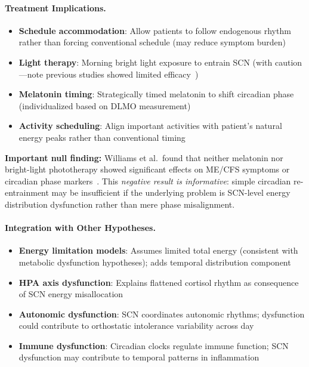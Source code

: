 \begin{hypothesis}
\paragraph{Treatment Implications.}
\begin{itemize}
  \item \textbf{Schedule accommodation}: Allow patients to follow endogenous rhythm rather than forcing conventional schedule (may reduce symptom burden)
  \item \textbf{Light therapy}: Morning bright light exposure to entrain SCN (with caution---note previous studies showed limited efficacy~\cite{williams2002therapy})
  \item \textbf{Melatonin timing}: Strategically timed melatonin to shift circadian phase (individualized based on DLMO measurement)
  \item \textbf{Activity scheduling}: Align important activities with patient's natural energy peaks rather than conventional timing
\end{itemize}

\textbf{Important null finding:}
Williams et al.\ found that neither melatonin nor bright-light phototherapy showed significant effects on ME/CFS symptoms or circadian phase markers~\cite{williams2002therapy}. This \textit{negative result is informative}: simple circadian re-entrainment may be insufficient if the underlying problem is SCN-level energy distribution dysfunction rather than mere phase misalignment.

\paragraph{Integration with Other Hypotheses.}
\begin{itemize}
  \item \textbf{Energy limitation models}: Assumes limited total energy (consistent with metabolic dysfunction hypotheses); adds temporal distribution component
  \item \textbf{HPA axis dysfunction}: Explains flattened cortisol rhythm as consequence of SCN energy misallocation
  \item \textbf{Autonomic dysfunction}: SCN coordinates autonomic rhythms; dysfunction could contribute to orthostatic intolerance variability across day
  \item \textbf{Immune dysfunction}: Circadian clocks regulate immune function; SCN dysfunction may contribute to temporal patterns in inflammation~\cite{scheiermann2018circadian}
\end{itemize}


\end{hypothesis}

